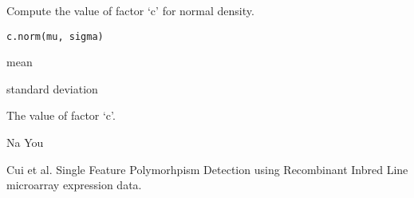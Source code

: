 \begin{Description}\relax
Compute the value of factor `c' for normal density.
\end{Description}
\begin{Usage}
\begin{verbatim}
c.norm(mu, sigma)
\end{verbatim}
\end{Usage}
\begin{Arguments}
\begin{ldescription}
\item[\code{mu}] mean

\item[\code{sigma}] standard deviation

\end{ldescription}
\end{Arguments}
\begin{Value}
The value of factor `c'.
\end{Value}
\begin{Author}\relax
Na You
\end{Author}
\begin{References}\relax
Cui et al.
Single Feature Polymorhpism Detection using Recombinant Inbred Line
microarray expression data.
\end{References}

